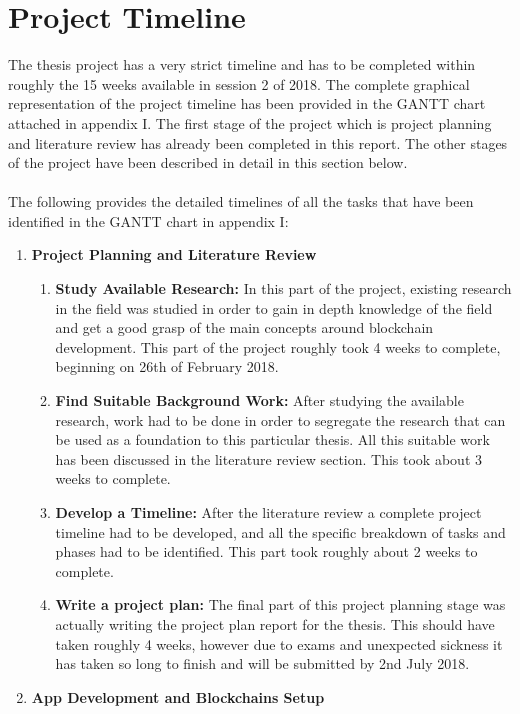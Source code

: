 \documentclass[a4paper,twoside,phd]{BYUPhys}
\begin{document}
\section{Project Timeline}
The thesis project has a very strict timeline and has to be completed within roughly the 15 weeks available in session 2 of 2018. The complete graphical representation of the project timeline has been provided in the GANTT chart attached in appendix I. The first stage of the project which is project planning and literature review has already been completed in this report. The other stages of the project have been described in detail in this section below.
\\
\\
The following provides the detailed timelines of all the tasks that have been identified in the GANTT chart in appendix I:
\begin{enumerate}
    \item \textbf{Project Planning and Literature Review}
    \begin{enumerate}
        \item \textbf{Study Available Research:} In this part of the project, existing research in the field was studied in order to gain in depth knowledge of the field and get a good grasp of the main concepts around blockchain development. This part of the project roughly took 4 weeks to complete, beginning on 26th of February 2018.
        \item \textbf{Find Suitable Background Work:} After studying the available research, work had to be done in order to segregate the research that can be used as a foundation to this particular thesis. All this suitable work has been discussed in the literature review section. This took about 3 weeks to complete.
        \item \textbf{Develop a Timeline:} After the literature review a complete project timeline had to be developed, and all the specific breakdown of tasks and phases had to be identified. This part took roughly about 2 weeks to complete.
        \item \textbf{Write a project plan:} The final part of this project planning stage was actually writing the project plan report for the thesis. This should have taken roughly 4 weeks, however due to exams and unexpected sickness it has taken so long to finish and will be submitted by 2nd July 2018.
    \end{enumerate}
    \item \textbf{App Development and Blockchains Setup}

\end{enumerate}
\end{document}
